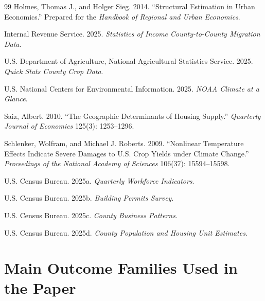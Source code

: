 \documentclass[12pt]{article}
\begin{document}
\begin{thebibliography}{99}
Holmes, Thomas J., and Holger Sieg. 2014. ``Structural Estimation in Urban Economics.'' Prepared for the \emph{Handbook of Regional and Urban Economics}.

Internal Revenue Service. 2025. \emph{Statistics of Income County-to-County Migration Data}.

U.S. Department of Agriculture, National Agricultural Statistics Service. 2025. \emph{Quick Stats County Crop Data}.

U.S. National Centers for Environmental Information. 2025. \emph{NOAA Climate at a Glance}.

Saiz, Albert. 2010. ``The Geographic Determinants of Housing Supply.'' \emph{Quarterly Journal of Economics} 125(3): 1253--1296.

Schlenker, Wolfram, and Michael J. Roberts. 2009. ``Nonlinear Temperature Effects Indicate Severe Damages to U.S. Crop Yields under Climate Change.'' \emph{Proceedings of the National Academy of Sciences} 106(37): 15594--15598.

U.S. Census Bureau. 2025a. \emph{Quarterly Workforce Indicators}.

U.S. Census Bureau. 2025b. \emph{Building Permits Survey}.

U.S. Census Bureau. 2025c. \emph{County Business Patterns}.

U.S. Census Bureau. 2025d. \emph{County Population and Housing Unit Estimates}.

\end{thebibliography}

\appendix

\section{Main Outcome Families Used in the Paper}
\end{document}
